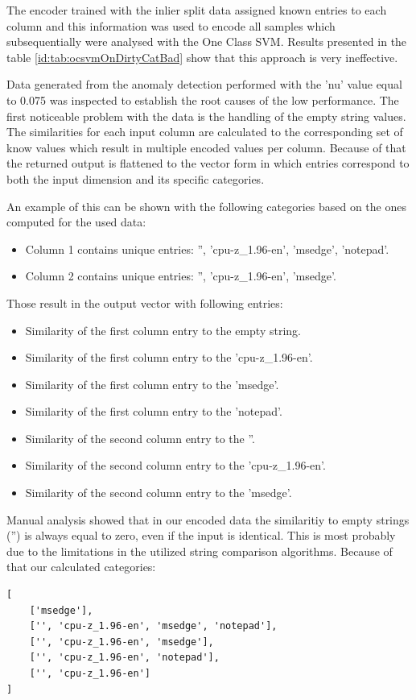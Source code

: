\documentclass[a4paper,twoside,12pt]{book}
\begin{document}
The encoder trained with the inlier split data assigned known entries to each column and this 
information was used to encode all samples which subsequentially were analysed with the One Class
SVM. Results presented in the table \ref{id:tab:ocsvmOnDirtyCatBad} show that this approach is 
very ineffective. 

Data generated from the anomaly detection performed with the 'nu' value equal to 0.075 was inspected 
to establish the root causes of the low performance. The first noticeable problem with the data
is the handling of the empty string values. The similarities for each input column are 
calculated to the corresponding set of know values which result in multiple encoded values per
column. Because of that the returned output is flattened to the vector form in which entries
correspond to both the input dimension and its specific categories. 

An example of this can be shown with the following categories based on the ones computed 
for the used data:
\begin{itemize}
	\item Column 1 contains unique entries: '', 'cpu-z\_1.96-en', 'msedge', 'notepad'.
	\item Column 2 contains unique entries: '', 'cpu-z\_1.96-en', 'msedge'.
\end{itemize}

Those result in the output vector with following entries:
\begin{itemize}
	\item Similarity of the first column entry to the empty string.
	\item Similarity of the first column entry to the 'cpu-z\_1.96-en'.
	\item Similarity of the first column entry to the 'msedge'.
	\item Similarity of the first column entry to the 'notepad'.
	\item Similarity of the second column entry to the ''.
	\item Similarity of the second column entry to the 'cpu-z\_1.96-en'.
	\item Similarity of the second column entry to the 'msedge'.
\end{itemize}

Manual analysis showed that in our encoded data the similaritiy to empty strings ('') is 
always equal to zero, even if the input is identical. This is most probably due to the limitations 
in the utilized string comparison algorithms. Because of that our calculated categories:
\begin{lstlisting}
[
	['msedge'],
	['', 'cpu-z_1.96-en', 'msedge', 'notepad'],
 	['', 'cpu-z_1.96-en', 'msedge'],
	['', 'cpu-z_1.96-en', 'notepad'],
 	['', 'cpu-z_1.96-en']
]
\end{lstlisting}
\end{document}
